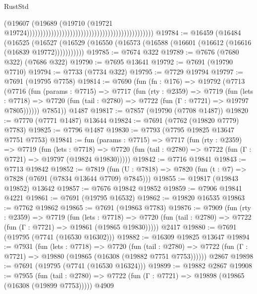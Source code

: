 \begin{lexlean}{RustStd}
\begin{coremodule}
                                                                                          (@19607
                                                                                            (@19689
                                                                                              (@19710
                                                                                                (@19721
                                                                                                  @19724)))))))))))))))))))))))))))))))))))))))))))))))
@19784 := @16459
    (@16484
      (@16525
        (@16527 (@16529 (@16550 (@16573 (@16588 (@16601 (@16612 (@16616 (@16839 @19772)))))))))))
@19785 := @7674 @322
@19789 := @7676 (@7680 @322) (@7686 @322)
@19790 := @7695 @13641
@19792 := @7691 (@19790 @7710)
@19794 := @7733 (@7734 @322)
@19795 := @7729 @19794
@19797 := @7691 (@19795 @7758)
@19814 := @7690
    (fun (fn : @176) =>
    @19792
      (@7713
        (@7716
          (fun (params : @7715) =>
          @7717
            (fun (rty : @2359) =>
            @7719
              (fun (lets : @7718) =>
              @7720 (fun (tail : @2780) => @7722 (fun (Γ : @7721) => @19797 @7805))))))
        @7851))
    @1487
@19817 := @7857 (@19790 (@7708 @1487))
@19820 := @7770 (@7771 @1487) @13644
@19824 := @7691 (@7762 (@19820 @7779) @7783)
@19825 := @7796 @1487
@19830 := @7793 (@7795 @19825 @13647 @7751 @7753)
@19841 := fun (params : @7715) =>
  @7717
    (fun (rty : @2359) =>
    @7719
      (fun (lets : @7718) =>
      @7720 (fun (tail : @2780) => @7722 (fun (Γ : @7721) => @19797 (@19824 @19830)))))
@19842 := @7716 @19841
@19843 := @7713 @19842
@19852 := @7819
    (fun (U : @7818) => @7820 (fun (t : @7) => @7828 (@7691 (@7834 @13644 @7709) @7845)))
@19855 := @19817 (@19843 @19852) @13642
@19857 := @7676 @19842 @19852
@19859 := @7906 @19841 @4221
@19861 := @7691 (@19795 @16532)
@19862 := @19820 @16535
@19863 := @7762 @19862
@19865 := @7691 (@19863 @7783)
@19876 := @7909
    (fun (rty : @2359) =>
    @7719
      (fun (lets : @7718) =>
      @7720 (fun (tail : @2780) => @7722 (fun (Γ : @7721) => @19861 (@19865 @19830)))))
    @2417
@19880 := @7691 (@19795 (@7741 (@16530 @16302)))
@19882 := @16309 @19825 @13647
@19894 := @7931
    (fun (lets : @7718) =>
    @7720
      (fun (tail : @2780) =>
      @7722 (fun (Γ : @7721) => @19880 (@19865 (@16308 (@19882 @7751 @7753))))))
    @2867
@19898 := @7691 (@19795 (@7741 (@16530 @16324)))
@19899 := @19882 @2867
@19908 := @7955
    (fun (tail : @2780) => @7722 (fun (Γ : @7721) => @19898 (@19865 (@16308 (@19899 @7753)))))
    @4909

\end{coremodule}
\end{lexlean}
